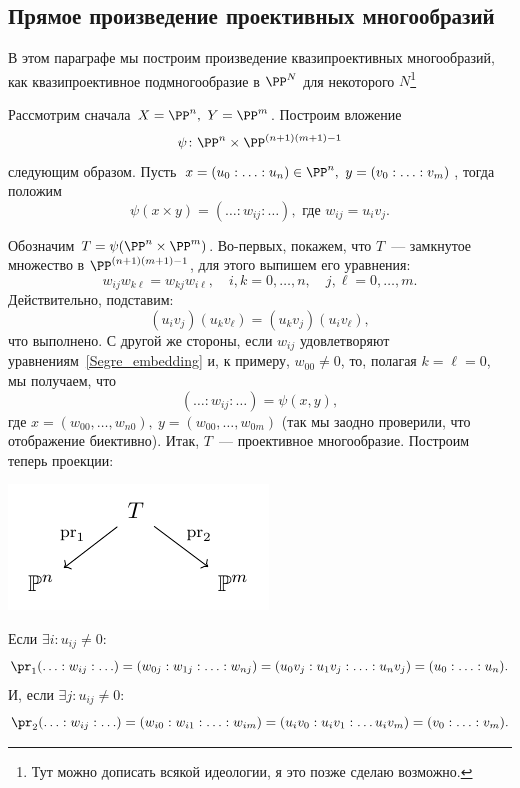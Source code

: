 	\subsection{Прямое произведение проективных многообразий}\label{dir_prod}

    \hypertarget{bilet_20}{}

	В этом параграфе мы построим произведение квазипроективных многообразий, как квазипроективное подмногообразие в $\PP^N$ для некоторого $N$\footnote{Тут можно дописать всякой идеологии, я это позже сделаю возможно. }

	Рассмотрим сначала $X = \PP^n, \ Y = \PP^m$. Построим вложение 
	\[
		\psi\colon \PP^n \times \PP^{(n + 1)(m + 1) - 1}
	\]
	следующим образом. Пусть $x = (u_0 : \ldots : u_n) \in \PP^n, \ y = (v_0 : \ldots : v_m)$,  тогда положим 
	\[
		\psi(x \times y) = (\ldots : w_{i j} : \ldots), \text{ где } w_{i j} = u_i v_j.
 	\]

 	Обозначим $T = \psi(\PP^n \times \PP^m)$. Во-первых, покажем, что $T$~--- замкнутое множество в $\PP^{(n + 1)(m + 1) - 1}$, для этого выпишем его уравнения: 
 	\begin{equation}
 		w_{i j} w_{k \ell} = w_{k j} w_{i \ell}, \quad i, k = 0, \ldots, n, \quad j, \ell = 0, \ldots, m. \label{Segre_embedding}
 	\end{equation}
 	Действительно, подставим: 
 	\[
 		(u_i v_j) (u_k v_\ell) = (u_k v_j) (u_i v_{\ell}),
 	\]
 	что выполнено. С другой же стороны, если $w_{i j}$ удовлетворяют уравнениям~\eqref{Segre_embedding} и, к примеру, $w_{0 0} \neq 0$, то, полагая $k = \ell = 0$, мы получаем, что  
 	\[
 		(\ldots : w_{i j} : \ldots ) = \psi(x, y),
 	\]
 	где $x = (w_{0 0}, \ldots, w_{n 0}), \ y = (w_{0 0}, \ldots, w_{0 m})$ (так мы заодно проверили, что отображение биективно). Итак, $T$~--- проективное многообразие. Построим теперь проекции: 

 	\begin{center}
 		\includegraphics{lectures/5/pictures/cd_5.pdf}
 	\end{center}

 	Если $\exists i\colon u_{i j} \neq 0$:
 	\[
 		\pr_1(\ldots : w_{i j} : \ldots ) = (w_{0 j} : w_{1 j} : \ldots : w_{n j}) = (u_{0} v_j : u_{1} v_j : \ldots : u_{n} v_j) = (u_0 : \ldots : u_n).
 	\]
 	И, если $\exists j\colon u_{i j} \neq 0$:
 	\[
 		\pr_2(\ldots : w_{i j} : \ldots) = (w_{i 0} : w_{i 1} : \ldots : w_{i m}) = (u_i v_0 : u_i v_1 : \ldots u_i v_m) = (v_0 : \ldots : v_m).
 	\]

